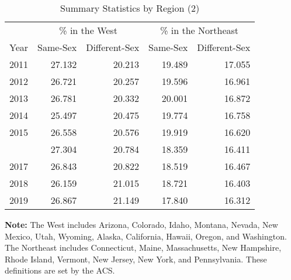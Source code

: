 \begin{table}[htbp]

\caption{Summary Statistics by Region (2)}
\label{region_2} %
\centering
\begin{tabular}[t]{rrrrr}
\toprule
\multicolumn{1}{c}{ } & \multicolumn{2}{c}{\% in the West} & \multicolumn{2}{c}{\% in the Northeast} \\
\cmidrule(l{3pt}r{3pt}){2-3} \cmidrule(l{3pt}r{3pt}){4-5}
Year & Same-Sex & Different-Sex & Same-Sex & Different-Sex\\
\midrule
2011 & 27.132 & 20.213 & 19.489 & 17.055\\
2012 & 26.721 & 20.257 & 19.596 & 16.961\\
2013 & 26.781 & 20.332 & 20.001 & 16.872\\
2014 & 25.497 & 20.475 & 19.774 & 16.758\\
2015 & 26.558 & 20.576 & 19.919 & 16.620\\
\addlinespace
2016 & 27.304 & 20.784 & 18.359 & 16.411\\
2017 & 26.843 & 20.822 & 18.519 & 16.467\\
2018 & 26.159 & 21.015 & 18.721 & 16.403\\
2019 & 26.867 & 21.149 & 17.840 & 16.312\\
\bottomrule
\end{tabular}
\vspace{0.5em}
\begin{minipage}{0.85\textwidth} %
\small \textbf{Note:} The West includes Arizona, Colorado, Idaho, Montana, Nevada, New Mexico, Utah, Wyoming, Alaska, California, Hawaii, Oregon, and Washington. The Northeast includes Connecticut, Maine, Massachusetts, New Hampshire, Rhode Island, Vermont, New Jersey, New York, and Pennsylvania. These definitions are set by the ACS.
\end{minipage}
\end{table}
